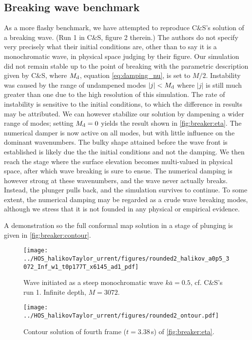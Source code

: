 \documentclass[a4paper,12pt]{article}
\renewcommand{\_}[1]{_\mr{#1}}
\newcommand{\refCS}{C\&S}
\begin{document}
\subsection*{Breaking wave benchmark}

As a more flashy benchmark, we have attempted to reproduce \refCS{}'s solution of a breaking wave. (Run 1 in \refCS{}, figure 2 therein.)
The authors do not specify very precisely what their initial conditions are, other than to say it is a monochromatic wave, in physical space judging by their figure.
Our simulation did not remain stable up to the point of breaking with the parametric description given by \refCS{}, where $M\_d$, equation \eqref{eq:damping_nu}, is set to $M/2$.
Instability was caused by the range of undampened modes $|j|<M\_d$ where $|j|$ is still much greater than one due to the high resolution of this simulation. 
The rate of instability is sensitive to the initial conditions, to which the difference in results may be attributed. 
We can however stabilize our solution by dampening a wider range of modes; setting $M\_d=0$ yields the result shown in \autoref{fig:breaker:eta}.
The numerical damper is now active on all modes, but with little influence on the dominant wavenumbers. 
The bulky shape attained before the wave front is established is likely due the the initial conditions and not the damping.
We then reach the stage where the surface elevation becomes multi-valued in physical space, after which wave breaking is sure to ensue. 
The numerical damping is however strong at these wavenumbers, and the wave never actually breaks.  
Instead, the plunger pulls back, and the simulation survives to continue. 
To some extent, the numerical damping may be regarded as a crude wave breaking modes, although we stress that it is not founded in any physical or empirical evidence. 

A demonstration so the full conformal map solution in a stage of plunging is given in \autoref{fig:breaker:contour}.
\\
\begin{figure}[h!ptb]%
\centering
\texttt{[image: ../HOS\_ChalikovTaylor\_current/figures/rounded2\_Chalikov\_ka0p5\_M3072\_hInf\_Nw1\_dt0p177T\_nx6145\_pad1\_.pdf]}%
\caption{Wave initiated as a steep monochromatic wave $k\bar a=0.5$, cf. \refCS{}'s run 1. Infinite depth, $M=3072$.}%
\label{fig:breaker:eta}%
\end{figure}
\begin{figure}[h!ptb]%
\centering
\texttt{[image: ../HOS\_ChalikovTaylor\_current/figures/rounded2\_contour.pdf]}%
\caption{Contour solution of fourth frame ($t=3.38$\,s) of \autoref{fig:breaker:eta}.}%
\label{fig:breaker:contour}%
\end{figure}
\end{document}
